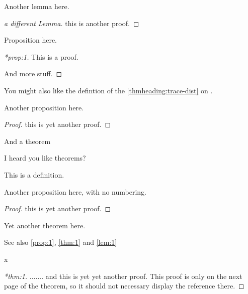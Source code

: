 \documentclass[12pt,a5paper]{article}
\begin{document}
\begin{lemma}
\label{lem:1}
Another lemma here.
\end{lemma}
\begin{proof}[a different Lemma]
  this is another proof.
\end{proof}


\begin{proposition}
  \label{prop:1}
  Proposition here.
\end{proposition}
\begin{proof}[*prop:1]
  This is a proof.

  And more stuff.
\end{proof}


You might also like the defintion of the \ref{thmheading:trace-dist} on .

\begin{proposition}
  \noproofref
  Another proposition here.
\end{proposition}
\begin{proof}
  this is yet another proof.
\end{proof}


\begin{theorem}
\label{thm:1}
And a theorem
\end{theorem}


\begin{theorem}
\noproofref
\label{thm:2}
I heard you like theorems?
\end{theorem}

\begin{definition*}
This is a definition.
\end{definition*}


\begin{proposition*}
Another proposition here, with no numbering.
\end{proposition*}
\begin{proof}
  this is yet another proof.
\end{proof}

\begin{theorem}
  \label{thm:another}
  Yet another theorem here.
\end{theorem}


See also \autoref{prop:1}, \autoref{thm:1} and \autoref{lem:1}

\cleardoublepage
x
\begin{proof}[*thm:1]
  ....... and this is yet yet another proof.  This proof is only on the next page of the
  theorem, so it should not necessary display the reference there.
\end{proof}
\end{document}
